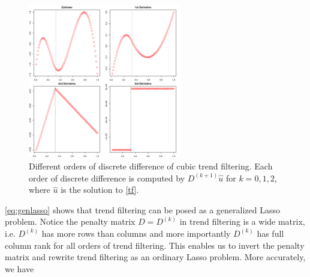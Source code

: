 \documentclass[a4paper]{article}
\begin{document}
\begin{figure}[t!]
\centering
\includegraphics[width = 0.6\textwidth]{Figures/Figure3.pdf}
\caption{Different orders of discrete difference of cubic trend filtering. Each order of discrete difference is computed by $D^{(k+1)}\hat{u}$ for $k=0,1,2$, where $\hat{u}$ is the solution to \eqref{tf}.}
\label{fig:Figure3_discrete}
\end{figure}

\eqref{eq:genlasso} shows that trend filtering can be posed as a generalized Lasso problem. Notice the penalty matrix $D=D^{(k)}$ in trend filtering is a wide matrix, i.e. $D^{(k)}$ has more rows than columns and more importantly $D^{(k)}$ has full column rank for all orders of trend filtering. This enables us to invert the penalty matrix and rewrite trend filtering as an ordinary Lasso problem. More accurately, we have
\end{document}
